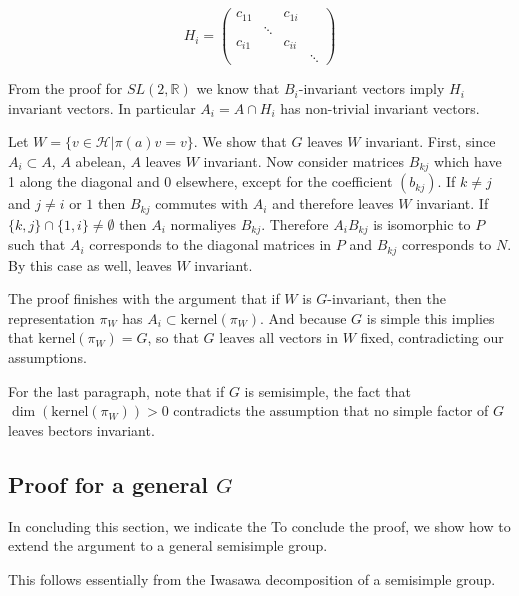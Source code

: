 \documentclass[
  12pt
]{article}
\theoremstyle{plain}
\newcommand{\G}{\ensuremath{G}\xspace}
\newcommand{\hilb}{\ensuremath{\mathscr{H}}\xspace}
\newcommand{\sltr}{\ensuremath{SL(2, \mathbb{R})}\xspace}
\begin{document}
  $$
  H_i = \begin{pmatrix}
    c_{11} & & c_{1i} & \\
           & \ddots & & \\
    c_{i1} & & c_{ii}&  \\
           & & & \ddots
  \end{pmatrix}
  $$

  From the proof for \sltr we know that $B_i$-invariant vectors imply $H_i$ invariant vectors. In particular $A_i = A \cap H_i$ has non-trivial invariant vectors.

  Let $W = \{v \in \hilb | \pi(a)v=v\}$. We show that \G leaves $W$ invariant.
  First, since $A_i \subset A$, $A$ abelean, $A$ leaves $W$ invariant. Now
  consider matrices $B_{kj}$ which have 1 along the diagonal and 0 elsewhere,
  except for the coefficient $(b_{kj})$. If $k\neq j$ and $j\neq i$ or $1$ then
  $B_{kj}$ commutes with $A_i$ and therefore leaves $W$ invariant. If
  $\{k,j\}\cap \{1,i\} \neq \emptyset$ then $A_i$ normaliyes $B_{kj}$.
  Therefore $A_iB_{kj}$ is isomorphic to $P$ such that $A_i$ corresponds to the
  diagonal matrices in $P$ and $B_{kj}$ corresponds to $N$. By
   this case as well, leaves $W$ invariant.

  The proof finishes with the argument that if $W$ is \G-invariant, then the
  representation $\pi_W$ has $A_i \subset \text{kernel}(\pi_W)$. And because \G
  is simple this implies that $\text{kernel}(\pi_W) = G$, so that \G leaves all
  vectors in $W$ fixed, contradicting our assumptions.

  For the last paragraph, note that if \G is semisimple, the fact that
  $\dim(\text{kernel}(\pi_W)) >0$ contradicts the assumption that no simple
  factor of \G leaves bectors invariant.




\hypertarget{proof-for-a-general-G}{%
\subsection{Proof for a general \texorpdfstring{$G$}{G}}\label{proof-for-a-general-G}}



   In concluding this section, we indicate the
   To conclude the proof, we show how to extend the argument to a general semisimple group.

   This follows essentially from the Iwasawa decomposition of a semisimple group.
\end{document}
